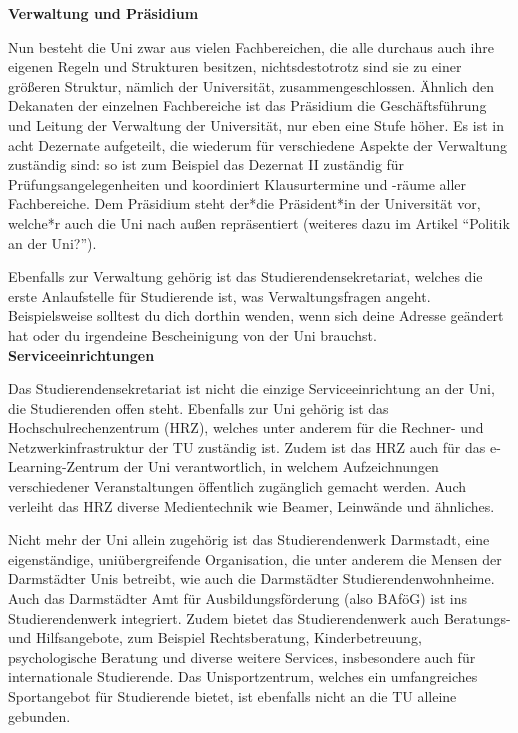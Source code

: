 {\textbf{Verwaltung und Präsidium}

Nun besteht die Uni zwar aus vielen Fachbereichen, die alle durchaus auch ihre eigenen Regeln und Strukturen besitzen, nichtsdestotrotz sind sie zu einer größeren Struktur, nämlich der Universität, zusammengeschlossen. Ähnlich den Dekanaten der einzelnen Fachbereiche ist das Präsidium die Geschäftsführung und Leitung der Verwaltung der Universität, nur eben eine Stufe höher. Es ist in acht Dezernate aufgeteilt, die wiederum für verschiedene Aspekte der Verwaltung zuständig sind: so ist zum Beispiel das Dezernat II zuständig für Prüfungsangelegenheiten und koordiniert Klausurtermine und -räume aller Fachbereiche. Dem Präsidium steht der*die Präsident*in der Universität vor, welche*r auch die Uni nach außen repräsentiert (weiteres dazu im Artikel "`Politik an der Uni?"').

Ebenfalls zur Verwaltung gehörig ist das Studierendensekretariat, welches die erste Anlaufstelle für Studierende ist, was Verwaltungsfragen angeht. Beispielsweise solltest du dich dorthin wenden, wenn sich deine Adresse geändert hat oder du irgendeine Bescheinigung von der Uni brauchst.\\

\textbf{Serviceeinrichtungen}

Das Studierendensekretariat ist nicht die einzige Serviceeinrichtung an der Uni, die Studierenden offen steht. Ebenfalls zur Uni gehörig ist das Hochschulrechenzentrum (HRZ), welches unter anderem für die Rechner- und Netzwerkinfrastruktur der TU zuständig ist. Zudem ist das HRZ auch für das e-Learning-Zentrum der Uni verantwortlich, in welchem Aufzeichnungen verschiedener Veranstaltungen öffentlich zugänglich gemacht werden. Auch verleiht das HRZ diverse Medientechnik wie Beamer, Leinwände und ähnliches.

Nicht mehr der Uni allein zugehörig ist das Studierendenwerk Darmstadt, eine eigenständige, uniübergreifende Organisation, die unter anderem die Mensen der Darmstädter Unis betreibt, wie auch die Darmstädter Studierendenwohnheime. Auch das Darmstädter Amt für Ausbildungsförderung (also BAföG) ist ins Studierendenwerk integriert. Zudem bietet das Studierendenwerk auch Beratungs- und Hilfsangebote, zum Beispiel Rechtsberatung, Kinderbetreuung, psychologische Beratung und diverse weitere Services, insbesondere auch für internationale Studierende. Das Unisportzentrum, welches ein umfangreiches Sportangebot für Studierende bietet, ist ebenfalls nicht an die TU alleine gebunden.

}

